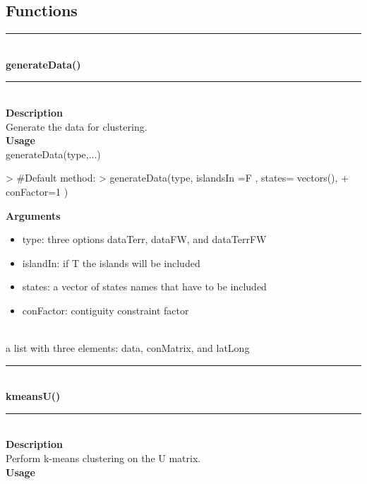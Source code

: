 \documentclass{article}
\begin{document}
\subsection{Functions}
\noindent\rule{14cm}{0.4pt}\\
{\bf \large generateData() } \\
\noindent\rule{14cm}{0.4pt}\\
{\bf Description}\\
    Generate the data for clustering.\\
    
{\bf Usage}\\
 
 generateData(type,...)
\begin{Schunk}
\begin{Sinput}
>   #Default method:
>   generateData(type, islandsIn =F , states= vectors(),
+                conFactor=1 )
\end{Sinput}
\end{Schunk}
{\bf Arguments}
\begin {itemize}
\item type: three options dataTerr, dataFW, and dataTerrFW
\item islandIn: if T the islands will be included
\item states: a vector of states names that have to be included
\item conFactor:  contiguity constraint factor
\end {itemize}
\hspace*{5mm}{\bf Returns}\\
  a list with three elements: data, conMatrix, and latLong\\

\noindent\rule{14cm}{0.4pt}\\
{\bf \large kmeansU() } \\
\noindent\rule{14cm}{0.4pt}\\
{\bf Description}\\
    Perform k-means clustering on the U matrix.\\
    
{\bf Usage}\\
 
\end{document}
